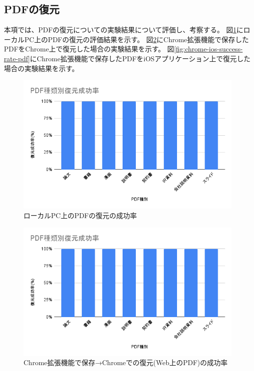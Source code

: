 \subsection{PDFの復元}
本項では、PDFの復元についての実験結果について評価し、考察する。
図\ref{fig:local-success-rate-pdf}にローカルPC上のPDFの復元の評価結果を示す。
図\ref{fig:chrome-chrome-success-rate-pdf}にChrome拡張機能で保存したPDFをChrome上で復元した場合の実験結果を示す。
図\ref{fig:chrome-ios-success-rate-pdf}にChrome拡張機能で保存したPDFをiOSアプリケーション上で復元した場合の実験結果を示す。

\begin{figure}[htbp]
  \caption{ローカルPC上のPDFの復元の成功率}
  \label{fig:local-success-rate-pdf}
  \begin{center}
    \includegraphics[bb=0 0 600 371,width=15cm]{img/060_evaluation/success-rate-pdf.pdf}
  \end{center}
\end{figure}

\begin{figure}[htbp]
  \caption{Chrome拡張機能で保存→Chromeでの復元(Web上のPDF)の成功率}
  \label{fig:chrome-chrome-success-rate-pdf}
  \begin{center}
    \includegraphics[bb=0 0 600 371,width=15cm]{img/060_evaluation/success-rate-pdf.pdf}
  \end{center}
\end{figure}

